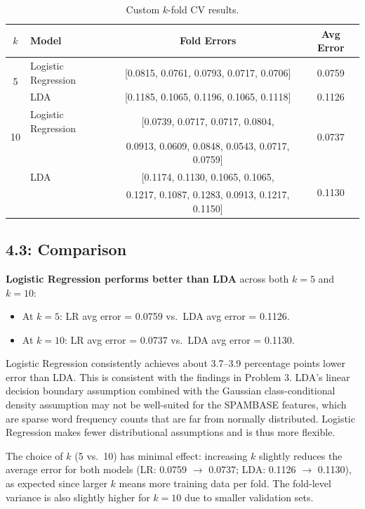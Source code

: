 \documentclass[11pt]{article}
\begin{document}
\begin{table}[h]
\centering
\begin{tabular}{clcc}
\toprule
$k$ & \textbf{Model} & \textbf{Fold Errors} & \textbf{Avg Error} \\
\midrule
\multirow{2}{*}{5} & Logistic Regression & [0.0815, 0.0761, 0.0793, 0.0717, 0.0706] & 0.0759 \\
 & LDA & [0.1185, 0.1065, 0.1196, 0.1065, 0.1118] & 0.1126 \\
\midrule
\multirow{2}{*}{10} & Logistic Regression & [0.0739, 0.0717, 0.0717, 0.0804, & \multirow{2}{*}{0.0737} \\
 & & 0.0913, 0.0609, 0.0848, 0.0543, 0.0717, 0.0759] & \\
 & LDA & [0.1174, 0.1130, 0.1065, 0.1065, & \multirow{2}{*}{0.1130} \\
 & & 0.1217, 0.1087, 0.1283, 0.0913, 0.1217, 0.1150] & \\
\bottomrule
\end{tabular}
\caption{Custom $k$-fold CV results.}
\end{table}

\subsection*{4.3: Comparison}

\textbf{Logistic Regression performs better than LDA} across both $k=5$ and $k=10$:
\begin{itemize}
    \item At $k=5$: LR avg error = 0.0759 vs.\ LDA avg error = 0.1126.
    \item At $k=10$: LR avg error = 0.0737 vs.\ LDA avg error = 0.1130.
\end{itemize}

Logistic Regression consistently achieves about 3.7--3.9 percentage points lower error than LDA. This is consistent with the findings in Problem 3. LDA's linear decision boundary assumption combined with the Gaussian class-conditional density assumption may not be well-suited for the SPAMBASE features, which are sparse word frequency counts that are far from normally distributed. Logistic Regression makes fewer distributional assumptions and is thus more flexible.

The choice of $k$ (5 vs.\ 10) has minimal effect: increasing $k$ slightly reduces the average error for both models (LR: 0.0759 $\to$ 0.0737; LDA: 0.1126 $\to$ 0.1130), as expected since larger $k$ means more training data per fold. The fold-level variance is also slightly higher for $k=10$ due to smaller validation sets.
\end{document}
